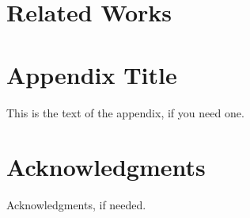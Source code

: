 \documentclass{sig-alternate}
\begin{document}
\section{Related Works}

\appendix
\section{Appendix Title}

This is the text of the appendix, if you need one.

\section{Acknowledgments}

Acknowledgments, if needed.


\makeatletter
  \def\@seccntformat#1{Appendix~\csname the#1\endcsname:\quad}
\makeatother

% 

\end{document}
